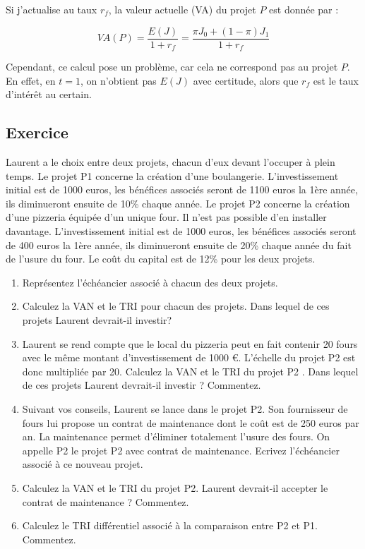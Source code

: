 \documentclass[a4paper, 12pt]{report}
\begin{document}
Si j'actualise au taux \( r_f \), la valeur actuelle (VA) du projet \( P \) est donnée par :

\[
VA(P) = \frac{E(J)}{1 + r_f} = \frac{\pi J_0 + (1 - \pi) J_1}{1 + r_f}
\]

Cependant, ce calcul pose un problème, car cela ne correspond pas au projet \( P \). En effet, en \( t = 1 \), on n'obtient pas \( E(J) \) avec certitude, alors que \( r_f \) est le taux d'intérêt au certain.

\subsection{Exercice}

Laurent a le choix entre deux projets, chacun d'eux devant l'occuper à plein temps. Le projet   P1 concerne la création d'une boulangerie. L'investissement initial est de 1000 euros, les bénéfices associés seront de 1100 euros la 1ère année, ils diminueront ensuite de 10\% chaque année. Le projet  P2  concerne la création d'une pizzeria équipée d'un unique four. Il n'est pas possible d'en installer davantage. L'investissement initial est de 1000 euros, les bénéfices associés seront de 400 euros la 1ère année, ils diminueront ensuite de 20\% chaque année du fait de l'usure du four. Le coût du capital est de 12\% pour les deux projets.
\begin{enumerate}
	\item Représentez l'échéancier associé à chacun des deux projets.
	\item Calculez la VAN et le TRI pour chacun des projets. Dans lequel de ces projets Laurent devrait-il investir?
	\item Laurent se rend compte que le local du pizzeria peut en fait contenir 20 fours avec le même montant d'investissement de 1000 €. L'échelle du projet P2 est donc multipliée par 20. Calculez la VAN et le TRI du projet P2 . Dans lequel de ces projets  Laurent devrait-il investir ? Commentez.
	\item Suivant vos conseils, Laurent se lance dans le projet  P2. Son fournisseur de fours lui propose un contrat de maintenance dont le coût est de 250 euros par an. La maintenance permet d'éliminer totalement l'usure des fours. On appelle  P2 le projet P2  avec contrat de maintenance. Ecrivez l'échéancier associé à ce nouveau projet. 
	\item Calculez la VAN et le TRI du projet  P2. Laurent devrait-il accepter le contrat de maintenance ? Commentez.
	\item Calculez le TRI différentiel associé à la comparaison entre   P2  et P1. Commentez.
	
\end{enumerate}
\end{document}
